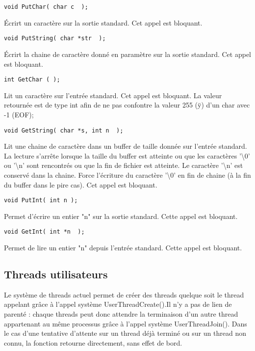 \documentclass{article}
\begin{document}
\begin{verbatim}
void PutChar( char c  );
\end{verbatim}
Écrirt un caractère sur la sortie standard. Cet appel est bloquant.

\begin{verbatim}
void PutString( char *str  );
\end{verbatim}
Écrirt la chaine de caractère donné en paramètre sur la sortie standard. Cet appel est bloquant.

\begin{verbatim}
int GetChar ( );
\end{verbatim}
Lit un caractère sur l'entrée standard. Cet appel est bloquant. La valeur retournée est de type int afin de ne pas confontre la valeur 255 (ÿ) d'un char avec -1 (EOF);

\begin{verbatim}
void GetString( char *s, int n  );
\end{verbatim}
Lit une chaine de caractère dans un buffer de taille donnée sur l'entrée standard. La lecture s'arrête lorsque la taille du buffer est atteinte ou que les caractères '\textbackslash 0' ou '\textbackslash n' sont rencontrés ou que la fin de fichier est atteinte. Le caractère '\textbackslash n' est conservé dans la chaine. Force l'écriture du caractère '\textbackslash 0' en fin de chaine (à la fin du buffer dans le pire cas). Cet appel est bloquant.

\begin{verbatim}
void PutInt( int n );
\end{verbatim}
Permet d'écrire un entier "n" sur la sortie standard. Cette appel est bloquant.


\begin{verbatim}
void GetInt( int *n  );
\end{verbatim}
Permet de lire un entier  "n" depuis l'entrée standard. Cette appel est bloquant.

\subsection{Threads utilisateurs}
Le système de threads actuel permet de créer des threads quelque soit le thread appelant grâce à l'appel système UserThreadCreate().Il n'y a pas de lien de parenté : chaque threads peut donc attendre la terminaison d'un autre thread appartenant au même processus grâce à l'appel système UserThreadJoin(). Dans le cas d'une tentative d'attente sur un thread déjà terminé ou sur un thread non connu, la fonction retourne directement, sans effet de bord.
\end{document}
